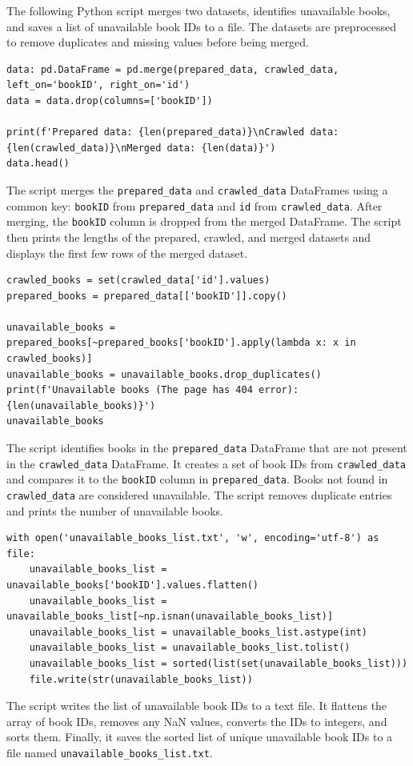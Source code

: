 \documentclass{solutionclass} %
\begin{document}
\begin{solution}
    The following Python script merges two datasets, identifies unavailable books, and saves a list of unavailable book IDs to a file. The datasets are preprocessed to remove duplicates and missing values before being merged.

\begin{lstlisting}
data: pd.DataFrame = pd.merge(prepared_data, crawled_data, left_on='bookID', right_on='id')
data = data.drop(columns=['bookID'])

print(f'Prepared data: {len(prepared_data)}\nCrawled data: {len(crawled_data)}\nMerged data: {len(data)}')
data.head()
\end{lstlisting}

The script merges the \texttt{prepared\_data} and \texttt{crawled\_data} DataFrames using a common key: \texttt{bookID} from \texttt{prepared\_data} and \texttt{id} from \texttt{crawled\_data}. After merging, the \texttt{bookID} column is dropped from the merged DataFrame. The script then prints the lengths of the prepared, crawled, and merged datasets and displays the first few rows of the merged dataset.

\begin{lstlisting}
crawled_books = set(crawled_data['id'].values)
prepared_books = prepared_data[['bookID']].copy()

unavailable_books = prepared_books[~prepared_books['bookID'].apply(lambda x: x in crawled_books)]
unavailable_books = unavailable_books.drop_duplicates()
print(f'Unavailable books (The page has 404 error): {len(unavailable_books)}')
unavailable_books
\end{lstlisting}

The script identifies books in the \texttt{prepared\_data} DataFrame that are not present in the \texttt{crawled\_data} DataFrame. It creates a set of book IDs from \texttt{crawled\_data} and compares it to the \texttt{bookID} column in \texttt{prepared\_data}. Books not found in \texttt{crawled\_data} are considered unavailable. The script removes duplicate entries and prints the number of unavailable books.

\begin{lstlisting}
with open('unavailable_books_list.txt', 'w', encoding='utf-8') as file:
    unavailable_books_list = unavailable_books['bookID'].values.flatten()
    unavailable_books_list = unavailable_books_list[~np.isnan(unavailable_books_list)]
    unavailable_books_list = unavailable_books_list.astype(int)
    unavailable_books_list = unavailable_books_list.tolist()
    unavailable_books_list = sorted(list(set(unavailable_books_list)))
    file.write(str(unavailable_books_list))
\end{lstlisting}

The script writes the list of unavailable book IDs to a text file. It flattens the array of book IDs, removes any NaN values, converts the IDs to integers, and sorts them. Finally, it saves the sorted list of unique unavailable book IDs to a file named \texttt{unavailable\_books\_list.txt}.

    
\end{solution}
\end{document}
